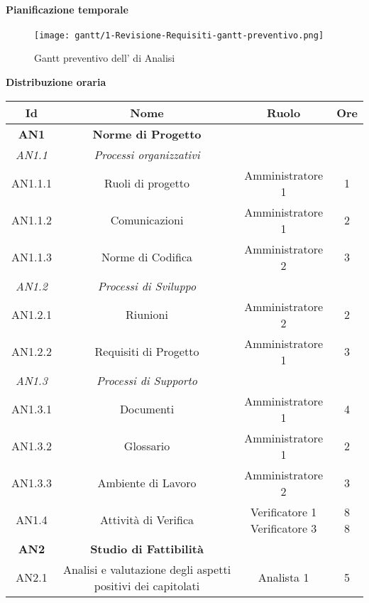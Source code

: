 \documentclass{scalatekids-article}
\begin{document}
\newpage
\paragraph{Pianificazione temporale}
\begin{figure}[H]
  \texttt{[image: gantt/1-Revisione-Requisiti-gantt-preventivo.png]}
  \caption*{Gantt preventivo dell' di Analisi}
\end{figure}

\newpage
\textbf{Distribuzione oraria}
\scriptsize
\begin{center}
  \begin{tabular}{| c | c | c | c |}
    \hline
    \textbf{Id} & \textbf{Nome} & \textbf{Ruolo} & \textbf{Ore}\\
    \hline
    \textbf{AN1} & \textbf{Norme di Progetto} & &\\
    \hline
    \textit{AN1.1} & \textit{Processi organizzativi} & &\\
    \hline
    AN1.1.1 & Ruoli di progetto & Amministratore 1 & 1\\
    \hline
    AN1.1.2 & Comunicazioni & Amministratore 1 & 2\\
    \hline
    AN1.1.3 & Norme di Codifica & Amministratore 2 & 3\\
    \hline
    \textit{AN1.2} & \textit{Processi di Sviluppo} & &\\
    \hline
    AN1.2.1 & Riunioni & Amministratore 2 & 2\\
    \hline
    AN1.2.2 & Requisiti di Progetto & Amministratore 1 & 3\\
    \hline
    \textit{AN1.3} & \textit{Processi di Supporto} & &\\
    \hline
    AN1.3.1 & Documenti & Amministratore 1 & 4\\
    \hline
    AN1.3.2 & Glossario & Amministratore 1 & 2\\
    \hline
    AN1.3.3 & Ambiente di Lavoro & Amministratore 2 & 3\\
    \hline
    AN1.4 & Attività di Verifica & \multiLineCell[t]{Verificatore 1\\Verificatore 3} & \multiLineCell[t]{8\\8}\\
    \hline
    \textbf{AN2} & \textbf{Studio di Fattibilità} & &\\
    \hline
    AN2.1 & Analisi e valutazione degli aspetti positivi dei capitolati & Analista 1 & 5\\
    \hline

\end{tabular}
\end{center}
\end{document}
